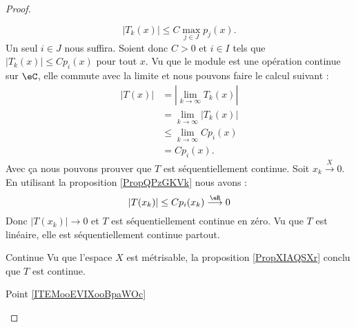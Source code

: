 \begin{proof}
\begin{subproof}
        \begin{equation}
            | T_k(x) |\leq C\max_{j\in J} p_j(x).
        \end{equation}
        Un seul \( i\in J\) nous suffira. Soient donc \( C>0\) et \( i\in I\) tels que \( | T_k(x) |\leq C p_i(x)\) pour tout \( x\). Vu que le module est une opération continue sur \( \eC\), elle commute avec la limite et nous pouvons faire le calcul suivant :
        \begin{subequations}
            \begin{align}
                | T(x) |&=| \lim_{k\to \infty} T_k(x) |\\
                &=\lim_{k\to \infty} | T_k(x) |\\
                &\leq \lim_{k\to \infty} Cp_i(x)\\
                &=Cp_i(x).
            \end{align}
        \end{subequations}
        Avec ça nous pouvons prouver que \( T\) est séquentiellement continue. Soit \( x_k\stackrel{X}{\longrightarrow}0\). En utilisant la proposition \ref{PropQPzGKVk} nous avons :
        \begin{equation}
            | T(x_k) |\leq C p_i(x_k)\stackrel{\eR}{\longrightarrow}0
        \end{equation}
        Donc \( | T(x_k) |\to 0\) et \( T\) est séquentiellement continue en zéro. Vu que \( T\) est linéaire, elle est séquentiellement continue partout.
    \item[Continue]
        Vu que l'espace \( X\) est métrisable, la proposition \ref{PropXIAQSXr} conclu que \( T\) est continue.
    \item[Point \ref{ITEMooEVIXooBpaWOc}]


\end{subproof}
\end{proof}
